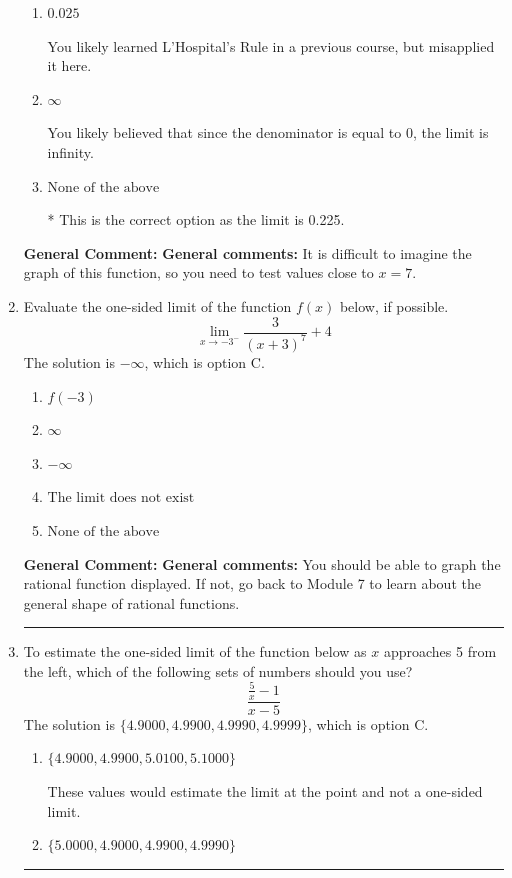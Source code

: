 \documentclass{extbook}[14pt]
\newcommand{\litem}[1]{\item #1

\rule{\textwidth}{0.4pt}}
\begin{document}
\begin{enumerate}
{\begin{enumerate}[label=\Alph*.]
You likely tried to use a shortcut to find the limit of a function that only works for when the numerator/denominator are polynomials.
\item \( 0.025 \)

You likely learned L'Hospital's Rule in a previous course, but misapplied it here.
\item \( \infty \)

You likely believed that since the denominator is equal to 0, the limit is infinity.
\item \( \text{None of the above} \)

* This is the correct option as the limit is 0.225.
\end{enumerate}

\textbf{General Comment:} \textbf{General comments:} It is difficult to imagine the graph of this function, so you need to test values close to $x = 7$.
}
\litem{
Evaluate the one-sided limit of the function $f(x)$ below, if possible.
\[ \lim_{x \rightarrow -3^-} \frac{3}{(x+3)^7}+4 \]The solution is \( -\infty \), which is option C.\begin{enumerate}[label=\Alph*.]
\item \( f(-3) \)


\item \( \infty \)


\item \( -\infty \)


\item \( \text{The limit does not exist} \)


\item \( \text{None of the above} \)


\end{enumerate}

\textbf{General Comment:} \textbf{General comments:} You should be able to graph the rational function displayed. If not, go back to Module 7 to learn about the general shape of rational functions.
}
\litem{
To estimate the one-sided limit of the function below as $x$ approaches 5 from the left, which of the following sets of numbers should you use?
\[ \frac{\frac{5}{x} - 1}{x - 5} \]The solution is \( \{ 4.9000, 4.9900, 4.9990, 4.9999 \} \), which is option C.\begin{enumerate}[label=\Alph*.]
\item \( \{ 4.9000, 4.9900, 5.0100, 5.1000 \} \)

These values would estimate the limit at the point and not a one-sided limit.
\item \( \{ 5.0000, 4.9000, 4.9900, 4.9990 \} \)


\end{enumerate}}
\end{enumerate}
\end{document}
